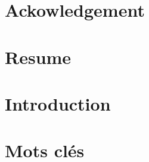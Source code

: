

\section*{Ackowledgement}\label{thk}


\clearpage

\section*{Resume}


\clearpage
\section*{Introduction}


\section*{Mots clés}


